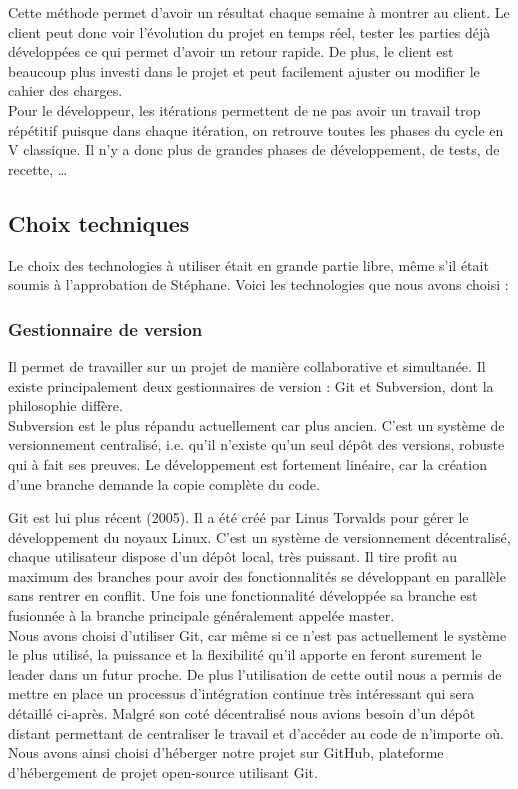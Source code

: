 Cette méthode permet d'avoir un résultat chaque semaine à montrer au client. Le client peut donc voir l'évolution du projet en temps réel, tester les parties déjà développées ce qui permet d'avoir un retour rapide. De plus, le client est beaucoup plus investi dans le projet et peut facilement ajuster ou modifier le cahier des charges.\\

Pour le développeur, les itérations permettent de ne pas avoir un travail trop répétitif puisque dans chaque itération, on retrouve toutes les phases du cycle en V classique. Il n'y a donc plus de grandes phases de développement, de tests, de recette, \dots{}

\subsection{Choix techniques}

Le choix des technologies à utiliser était en grande partie libre, même s'il était soumis à l'approbation de Stéphane. Voici les technologies que nous avons choisi :

\subsubsection{Gestionnaire de version}

Il permet de travailler sur un projet de manière collaborative et simultanée. Il existe principalement deux gestionnaires de version : Git et Subversion, dont la philosophie diffère.\\

Subversion est le plus répandu actuellement car plus ancien. C'est un système de versionnement centralisé, i.e. qu'il n'existe qu'un seul dépôt des versions, robuste qui à fait ses preuves. Le développement est fortement linéaire, car la création d'une branche demande la copie complète du code.

Git est lui plus récent (2005). Il a été créé par Linus Torvalds pour gérer le développement du noyaux Linux. C'est un système de versionnement décentralisé, chaque utilisateur dispose d'un dépôt local, très puissant. Il tire profit au maximum des branches pour avoir des fonctionnalités se développant en parallèle sans rentrer en conflit. Une fois une fonctionnalité développée sa branche est fusionnée à la branche principale généralement appelée master.\\

Nous avons choisi d'utiliser Git, car même si ce n'est pas actuellement le système le plus utilisé, la puissance et la flexibilité qu'il apporte en feront surement le leader dans un futur proche. De plus l'utilisation de cette outil nous a permis de mettre en place un processus d'intégration continue très intéressant qui sera détaillé ci-après. Malgré son coté décentralisé nous avions besoin d'un dépôt distant permettant de centraliser le travail et d'accéder au code de n'importe où. Nous avons ainsi choisi d'héberger notre projet sur GitHub, plateforme d'hébergement de projet open-source utilisant Git. 

